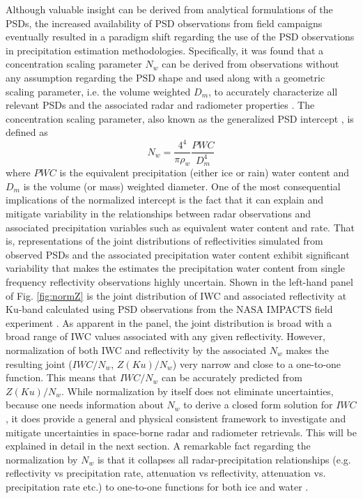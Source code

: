 \documentclass[10pt]{ietbook}
\begin{document}
Although valuable insight can be derived from analytical formulations of the PSDs, the increased availability of PSD observations from field
campaigns eventually resulted in a paradigm shift regarding the use of the PSD observations in precipitation estimation methodologies.  Specifically,
it was found that a concentration scaling parameter $N_w$ can be derived from observations without any assumption regarding the PSD shape 
and used along with a geometric scaling parameter, i.e.
the volume weighted $D_m$, to accurately characterize all relevant PSDs and the associated radar and radiometer properties \cite{norm_dsd_2001}.  
The concentration scaling
parameter, also known as the generalized PSD intercept \cite{bringi2003}, is defined as
\begin{equation} \label{eq:nw}
    N_w=\frac {4^4} {\pi \rho_w} \frac {PWC} {D_m^4}
\end{equation}
where $PWC$ is the equivalent precipitation (either ice or rain) water content and $D_m$ is the volume (or mass) weighted diameter.  One of
the most consequential implications of the normalized intercept is the fact that it can explain and mitigate variability in the relationships between
radar observations and associated precipitation variables such as equivalent water content and rate.  
That is, representations of the joint distributions of reflectivities simulated from 
observed PSDs and the associated precipitation water content exhibit significant variability that makes the estimates the precipitation water content
from single frequency reflectivity observations highly uncertain.  Shown in the left-hand panel of Fig. \ref{fig:normZ} is the joint distribution of 
IWC and associated reflectivity at Ku-band calculated using PSD observations from the NASA IMPACTS field experiment \cite{impacts2022}.  As apparent 
in the panel, the joint distribution is broad with a broad range of IWC values associated with any given reflectivity.  However, normalization of 
both IWC and reflectivity by the associated $N_w$ makes the resulting joint ($IWC/N_w$, $Z(Ku)/N_w$) very narrow and close to a one-to-one function.
This means that $IWC/N_w$ can be accurately predicted from $Z(Ku)/N_w$.  While normalization by itself does not eliminate uncertainties, because one
needs information about $N_w$ to derive a closed form solution for $IWC$, it does provide a general and physical consistent 
framework to investigate and mitigate uncertainties in space-borne radar and radiometer retrievals.  This will be explained in detail in the next 
section.  A remarkable fact regarding the normalization by $N_w$ is that it collapses all radar-precipitation relationships (e.g. reflectivity vs precipitation
rate, attenuation vs reflectivity, attenuation vs. precipitation rate etc.) to one-to-one functions for both ice and water \cite{ferreira2001}.
\end{document}

